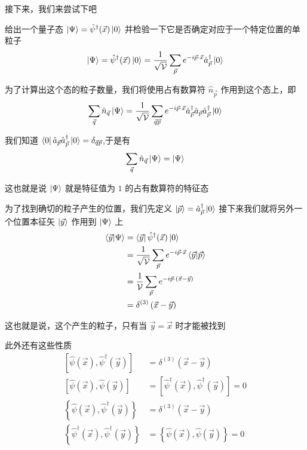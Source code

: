 接下来，我们来尝试下吧
\begin{example}
    给出一个量子态 $\ket{\Psi} = \hat{\psi}^\dagger (\vec{x})\ket{0}$ 并检验一下它是否确定对应于一个特定位置的单粒子
    \begin{equation*}
        \ket{\Psi} = \hat{\psi}^\dagger (\vec{x}) \ket{0} = \frac{1}{\sqrt{\mathcal{V}}} \sum_{\vec{p}} e^{-i\vec{p}\cdot\vec{x}} \hat{a}_{\vec{p}}^\dagger \ket{0}
    \end{equation*}

    为了计算出这个态的粒子数量，我们将使用占有数算符 $\hat{n}_{\vec{p}}$ 作用到这个态上，即 
    \begin{equation*}
        \sum_{\vec{q}} \hat{n}_{\vec{q}} \ket{\Psi} = \frac{1}{\sqrt{\mathcal{V}}} \sum_{\vec{q}\vec{p}} e^{-i\vec{p}\cdot\vec{x}} \hat{a}_{\vec{p}}^\dagger \hat{a}_{\vec{p}} \hat{a}_{\vec{p}}^\dagger \ket{0}
    \end{equation*}

    我们知道 $\bra{0} \hat{a}_{\vec{p}} \hat{a}_{\vec{p}}^\dagger \ket{0}  = \delta_{\vec{q}\vec{p}}$,于是有
    \begin{equation*}
        \sum_{\vec{q}} \hat{n}_{\vec{q}} \ket{\Psi} = \ket{\Psi}
    \end{equation*}

    这也就是说 $\ket{\Psi}$ 就是特征值为 $1$ 的占有数算符的特征态

    为了找到确切的粒子产生的位置，我们先定义 $\ket{\vec{p}} = \hat{a}_{\vec{p}}^\dagger \ket{0}$ 接下来我们就将另外一个位置本征矢 $\ket{\vec{y}}$ 作用到 $\ket{\Psi}$ 上 
    \begin{align*}
        \braket{\vec{y}}{\Psi} &= \bra{\vec{y}}\hat{\psi}^\dagger(\vec{x}) \ket{0} \\
        &= \frac{1}{\sqrt{\mathcal{V}}}\sum_{\vec{p}}e^{-i \vec{p}\cdot \vec{x}}\braket{\vec{y}}{\vec{p}} \\
        &= \frac{1}{\mathcal{V}} \sum_{\vec{p}}e^{-i\vec{p} \cdot \left(\vec{x} - \vec{y}\right)} \\
        &= \delta^{(3)}\left(\vec{x} - \vec{y}\right)
    \end{align*}

    这也就是说，这个产生的粒子，只有当 $\vec{y} = \vec{x}$ 时才能被找到
\end{example}

此外还有这些性质
\begin{align*}
    \left[\hat{\psi}(\vec{x}) , \hat{\psi}^\dagger(\vec{y})\right] &= \delta^{(3)} \left(\vec{x} - \vec{y}\right) \\
    \left[\hat{\psi}(\vec{x}) , \hat{\psi}(\vec{y})\right]&= \left[\hat{\psi}^\dagger(\vec{x}) , \hat{\psi}^\dagger(\vec{y})\right] = 0 \\
    \left\{\hat{\psi}(\vec{x}) , \hat{\psi}^\dagger(\vec{y})\right\} &= \delta^{(3)} \left(\vec{x} - \vec{y}\right) \\
    \left\{\hat{\psi}^\dagger(\vec{x}) , \hat{\psi}^\dagger(\vec{y})\right\} &= \left\{\hat{\psi}(\vec{x}) , \hat{\psi}(\vec{y})\right\} = 0
\end{align*}




